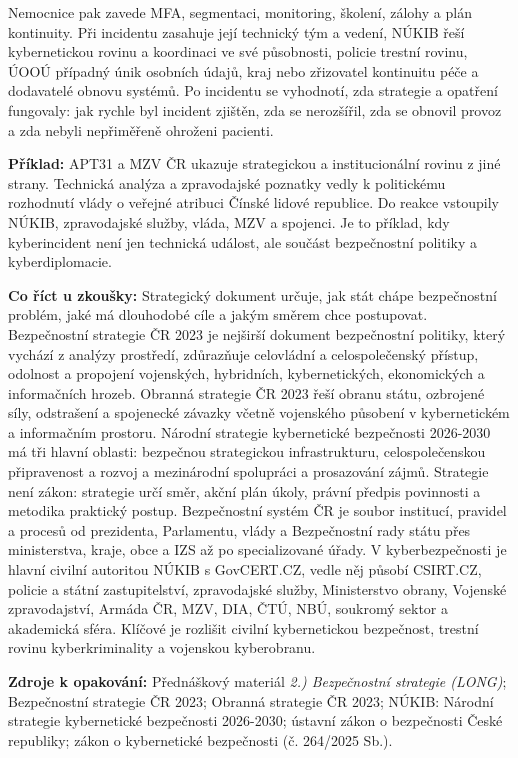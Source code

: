 \documentclass[11pt,a4paper]{article}
\newcommand{\zkouska}[1]{\begin{tcolorbox}[breakable,enhanced,colback=blue!7,colframe=blue!30!black,boxrule=0pt,arc=1mm,left=5pt,right=5pt,top=5pt,bottom=5pt,before skip=6pt,after skip=6pt]\textbf{Co říct u zkoušky:} #1\end{tcolorbox}}
\newcommand{\priklad}[1]{\begin{tcolorbox}[breakable,enhanced,colback=green!7,colframe=green!30!black,boxrule=0pt,arc=1mm,left=5pt,right=5pt,top=5pt,bottom=5pt,before skip=6pt,after skip=6pt]\textbf{Příklad:} #1\end{tcolorbox}}
\newcommand{\zdroje}[1]{\medskip\noindent\textbf{Zdroje k opakování:} #1\medskip}
\begin{document}
Nemocnice pak zavede MFA, segmentaci, monitoring, školení, zálohy a plán kontinuity. Při incidentu zasahuje její technický tým a vedení, NÚKIB řeší kybernetickou rovinu a koordinaci ve své působnosti, policie trestní rovinu, ÚOOÚ případný únik osobních údajů, kraj nebo zřizovatel kontinuitu péče a dodavatelé obnovu systémů. Po incidentu se vyhodnotí, zda strategie a opatření fungovaly: jak rychle byl incident zjištěn, zda se nerozšířil, zda se obnovil provoz a zda nebyli nepřiměřeně ohroženi pacienti.

\priklad{APT31 a MZV ČR ukazuje strategickou a institucionální rovinu z jiné strany. Technická analýza a zpravodajské poznatky vedly k politickému rozhodnutí vlády o veřejné atribuci Čínské lidové republice. Do reakce vstoupily NÚKIB, zpravodajské služby, vláda, MZV a spojenci. Je to příklad, kdy kyberincident není jen technická událost, ale součást bezpečnostní politiky a kyberdiplomacie.}

\zkouska{Strategický dokument určuje, jak stát chápe bezpečnostní problém, jaké má dlouhodobé cíle a jakým směrem chce postupovat. Bezpečnostní strategie ČR 2023 je nejširší dokument bezpečnostní politiky, který vychází z analýzy prostředí, zdůrazňuje celovládní a celospolečenský přístup, odolnost a propojení vojenských, hybridních, kybernetických, ekonomických a informačních hrozeb. Obranná strategie ČR 2023 řeší obranu státu, ozbrojené síly, odstrašení a spojenecké závazky včetně vojenského působení v kybernetickém a informačním prostoru. Národní strategie kybernetické bezpečnosti 2026-2030 má tři hlavní oblasti: bezpečnou strategickou infrastrukturu, celospolečenskou připravenost a rozvoj a mezinárodní spolupráci a prosazování zájmů. Strategie není zákon: strategie určí směr, akční plán úkoly, právní předpis povinnosti a metodika praktický postup. Bezpečnostní systém ČR je soubor institucí, pravidel a procesů od prezidenta, Parlamentu, vlády a Bezpečnostní rady státu přes ministerstva, kraje, obce a IZS až po specializované úřady. V kyberbezpečnosti je hlavní civilní autoritou NÚKIB s GovCERT.CZ, vedle něj působí CSIRT.CZ, policie a státní zastupitelství, zpravodajské služby, Ministerstvo obrany, Vojenské zpravodajství, Armáda ČR, MZV, DIA, ČTÚ, NBÚ, soukromý sektor a akademická sféra. Klíčové je rozlišit civilní kybernetickou bezpečnost, trestní rovinu kyberkriminality a vojenskou kyberobranu.}

\zdroje{Přednáškový materiál \emph{2.) Bezpečnostní strategie (LONG)}; Bezpečnostní strategie ČR 2023; Obranná strategie ČR 2023; NÚKIB: Národní strategie kybernetické bezpečnosti 2026-2030; ústavní zákon o bezpečnosti České republiky; zákon o kybernetické bezpečnosti (č. 264/2025 Sb.).}
\end{document}
